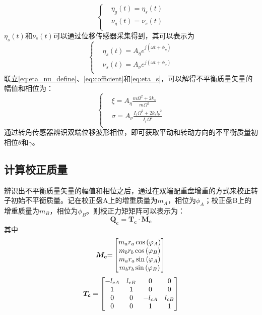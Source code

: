 \documentclass[
  lang=cn,
  degree=master,
  openany,oneside
]{nuaathesis}
\begin{document}
\begin{equation}
\label{eq:assumption}
\left\{
\begin{aligned}
& \eta _g (t) = \eta _s (t)\\
& \nu _g (t) = \nu _s (t)  \\
\end{aligned}
\right.
\end{equation}
$\eta _s(t)$和$\nu _s(t)$可以通过位移传感器采集得到，其可以表示为
\begin{equation}
\label{eq:eta_s}
\left\{
\begin{aligned}
& \eta _s (t) = A_{\eta}e^{j(\omega t + \phi _{\eta})} \\
& \nu _s (t) = A_{\nu}e^{j(\omega t + \phi _{\nu})} \\
\end{aligned}
\right.
\end{equation}
联立\autoref{eq:eta_nu_define}、\autoref{eq:cofficient}和\autoref{eq:eta_s}，可以解得不平衡质量矢量的幅值和相位为：
\begin{equation}
\left\{
\begin{aligned}
& \xi = A_{\eta}\frac{m{\Omega}^2 + 2k_s}{m{\Omega}^2}\\
& \sigma = A_{\nu}\frac{I_r{\Omega}^2 + 2k_s{l_b}^2}{I_r{\Omega}^2}\\
\end{aligned}
\right.
\end{equation}
通过转角传感器辨识双端位移波形相位，即可获取平动和转动方向的不平衡质量初相位$\theta$和$\gamma$。

\subsection{计算校正质量}

辨识出不平衡质量矢量的幅值和相位之后，通过在双端配重盘增重的方式来校正转子初始不平衡质量。记在校正盘A上的增重质量为$m_A$，相位为$\phi _A$；校正盘B上的增重质量为$m_B$，相位为$\phi _B$。则校正力矩矩阵可以表示为：
\begin{equation}
\boldsymbol{Q_c} = \boldsymbol{T_c} \cdot \boldsymbol{M_c}
\end{equation}
其中
\begin{equation}
\boldsymbol{M_c}{\rm{ = }}\left[ {\begin{matrix}
   {{m_a}{r_a}\cos \left( {{\varphi _A}} \right)}  \cr 
   {{m_b}{r_b}\cos \left( {{\varphi _B}} \right)}  \cr 
   {{m_a}{r_a}\sin \left( {{\varphi _A}} \right)}  \cr 
   {{m_b}{r_b}\sin \left( {{\varphi _B}} \right)}  \cr 

 \end{matrix} } \right]
\end{equation}
\begin{equation}
\boldsymbol{T_c} = \left[ {\begin{matrix}
   { - {l_{cA}}} & {{l_{cB}}} & 0 & 0  \cr 
   1 & 1 & 0 & 0  \cr 
   0 & 0 & { - {l_{cA}}} & {{l_{cB}}}  \cr 
   0 & 0 & 1 & 1  \cr 

 \end{matrix} } \right]
\end{equation}
\end{document}
